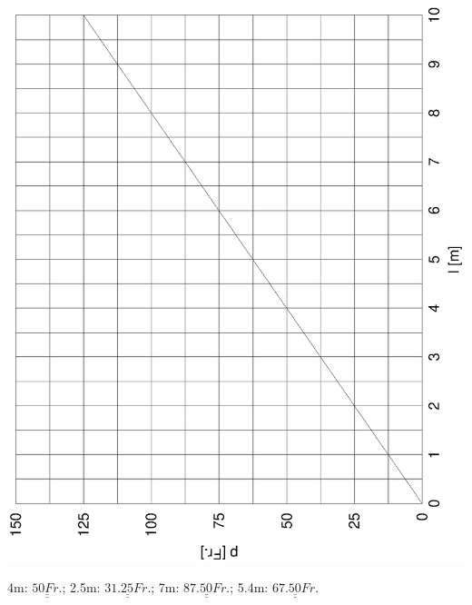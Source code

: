 \documentclass[%
11pt,%
twoside,%
titlepage,%
german,%
headsepline%
]{scrartcl}
\newcommand{\result}[1]{\underline{\underline{#1}}}
\begin{document}
{{\begin{enumerate}
\begin{center}
\includegraphics[angle=-90,width=\linewidth]{pictures/stoff.eps}
\end{center}

4\unit{m}: $\result{50\unit{Fr.}}$; 2.5\unit{m}: $\result{31.25\unit{Fr.}}$; 7\unit{m}: $\result{87.50\unit{Fr.}}$; 5.4\unit{m}: $\result{67.50\unit{Fr.}}$


\end{enumerate}}}
\end{document}

